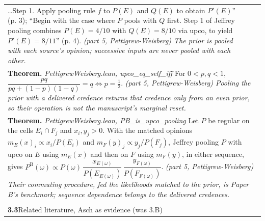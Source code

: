 \documentclass[10pt]{article}
\theoremstyle{definition}
\newcommand{\PB}{P^{\mathrm{B}}}
\newlength{\fullw}\setlength{\fullw}{25.9cm}
\newcommand{\entryhead}[2]{\multicolumn{3}{|l|}{\rule{0pt}{2.6ex}\large\textbf{#1}\quad #2} \\ \hline}
\begin{document}
{\begin{longtable}{|p{0.9cm}|p{12.2cm}|p{12.2cm}|}
{\ldots Step 1. Apply pooling rule $f$ to $P(E)$ and $Q(E)$ to obtain
$P'(E)$'' (p. 3); ``Begin with the case where $P$ pools with $Q$ first. Step 1
of Jeffrey pooling combines $P(E) = 4/10$ with $Q(E) = 8/10$ via upco, to
yield $P'(E) = 8/11$'' (p. 4). \newline \textit{(part 5, Pettigrew-Weisberg) The prior is pooled with each
source's opinion; successive inputs are never pooled with each other.}} \\
\multicolumn{3}{|p{\fullw}|}{\textbf{Theorem.} \textit{PettigrewWeisberg.lean, upco\_eq\_self\_iff} \newline For $0 < p, q < 1$,
$\dfrac{pq}{pq + (1-p)(1-q)} = q \iff p = \tfrac12$. \newline \textit{(part 5, Pettigrew-Weisberg) Pooling the prior with a delivered
credence returns that credence only from an even prior, so their operation
is not the manuscript's marginal reset.}} \\
\multicolumn{3}{|p{\fullw}|}{\textbf{Theorem.} \textit{PettigrewWeisberg.lean, PB\_is\_upco\_pooling} \newline Let $P$ be regular on the cells $E_i \cap F_j$ and $x_i, y_j > 0$.
With the matched opinions $m_E(x)_i \propto x_i / P(E_i)$ and
$m_F(y)_j \propto y_j / P(F_j)$, Jeffrey pooling $P$ with upco on $E$ using
$m_E(x)$ and then on $F$ using $m_F(y)$, in either sequence, gives
$\PB(\omega) \propto P(\omega)\, \dfrac{x_{E(\omega)}}{P(E_{E(\omega)})}\,
\dfrac{y_{F(\omega)}}{P(F_{F(\omega)})}$. \newline \textit{(part 5, Pettigrew-Weisberg) Their commuting procedure, fed the
likelihoods matched to the prior, is Paper B's benchmark; sequence dependence
belongs to the delivered credences.}} \\ \hline
\multicolumn{3}{|l|}{} \\ \hline
\entryhead{3.3}{Related literature, Asch as evidence (was 3.B)\quad{\footnotesize\textit{(formerly E.6)}}}

\end{longtable}}
\end{document}
